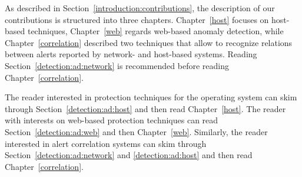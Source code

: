 As described in Section~\ref{introduction:contributions}, the
description of our contributions is structured into three
chapters. Chapter~\ref{host} focuses on host-based techniques,
Chapter~\ref{web} regards web-based anomaly detection, while
Chapter~\ref{correlation} described two techniques that allow to
recognize relations between alerts reported by network- and host-based
systems. Reading Section~\ref{detection:ad:network} is recommended
before reading Chapter~\ref{correlation}.

The reader interested in protection techniques for the operating
system can skim through Section~\ref{detection:ad:host} and then read
Chapter~\ref{host}. The reader with interests on web-based protection
techniques can read Section~\ref{detection:ad:web} and then
Chapter~\ref{web}. Similarly, the reader interested in alert
correlation systems can skim through
Section~\ref{detection:ad:network} and \ref{detection:ad:host} and
then read Chapter~\ref{correlation}.

